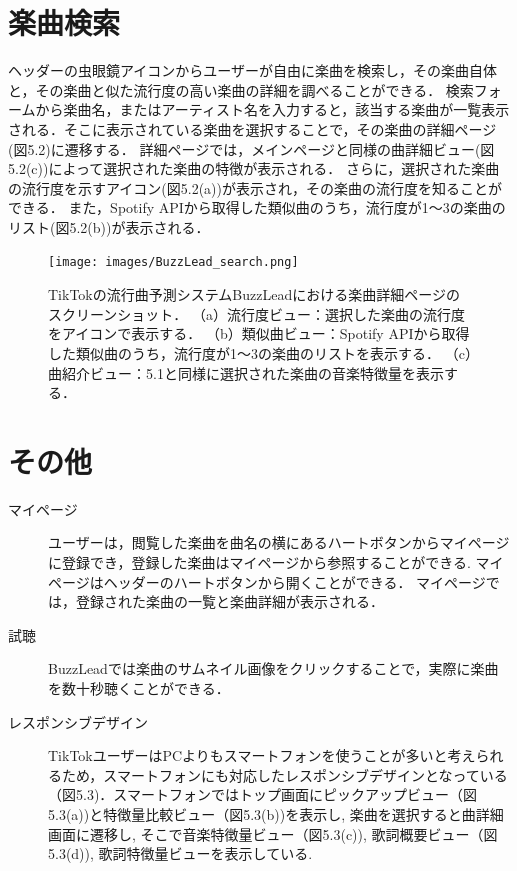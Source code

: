 \documentclass[titlepage]{jsreport}
\begin{document}
\section{楽曲検索}
ヘッダーの虫眼鏡アイコンからユーザーが自由に楽曲を検索し，その楽曲自体と，その楽曲と似た流行度の高い楽曲の詳細を調べることができる．
検索フォームから楽曲名，またはアーティスト名を入力すると，該当する楽曲が一覧表示される．そこに表示されている楽曲を選択することで，その楽曲の詳細ページ(図5.2)に遷移する．
詳細ページでは，メインページと同様の曲詳細ビュー(図5.2(c))によって選択された楽曲の特徴が表示される．
さらに，選択された楽曲の流行度を示すアイコン(図5.2(a))が表示され，その楽曲の流行度を知ることができる．
また，Spotify APIから取得した類似曲のうち，流行度が1～3の楽曲のリスト(図5.2(b))が表示される．

\begin{figure}[htb]
\begin{center}
\texttt{[image: images/BuzzLead\_search.png]}
\label{fig:search}
\caption{
  TikTokの流行曲予測システムBuzzLeadにおける楽曲詳細ページのスクリーンショット．
  （a）流行度ビュー：選択した楽曲の流行度をアイコンで表示する．
  （b）類似曲ビュー：Spotify APIから取得した類似曲のうち，流行度が1～3の楽曲のリストを表示する．
  （c）曲紹介ビュー：5.1と同様に選択された楽曲の音楽特徴量を表示する．
}
\end{center}
\end{figure}


\section{その他}
\begin{description}
  \item[マイページ] ユーザーは，閲覧した楽曲を曲名の横にあるハートボタンからマイページに登録でき，登録した楽曲はマイページから参照することができる.
    マイページはヘッダーのハートボタンから開くことができる．
    マイページでは，登録された楽曲の一覧と楽曲詳細が表示される．
  \item[試聴] BuzzLeadでは楽曲のサムネイル画像をクリックすることで，実際に楽曲を数十秒聴くことができる．
  \item[レスポンシブデザイン] TikTokユーザーはPCよりもスマートフォンを使うことが多いと考えられるため，スマートフォンにも対応したレスポンシブデザインとなっている（図5.3)．スマートフォンではトップ画面にピックアップビュー（図5.3(a))と特徴量比較ビュー（図5.3(b))を表示し, 楽曲を選択すると曲詳細画面に遷移し, そこで音楽特徴量ビュー（図5.3(c)), 歌詞概要ビュー（図5.3(d)), 歌詞特徴量ビューを表示している.
  
\end{description}
\end{document}
